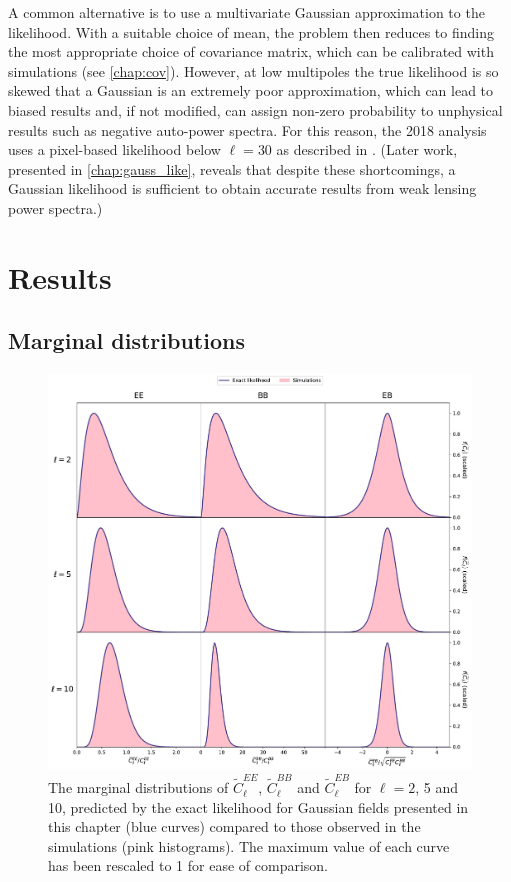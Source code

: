 A common alternative is to use a multivariate Gaussian approximation to the likelihood. With a suitable choice of mean, the problem then reduces to finding the most appropriate choice of covariance matrix, which can be calibrated with simulations (see \autoref{chap:cov}). However, at low multipoles the true likelihood is so skewed that a Gaussian is an extremely poor approximation, which can lead to biased results and, if not modified, can assign non-zero probability to unphysical results such as negative auto-power spectra. For this reason, the 2018 \Planck{} analysis uses a pixel-based likelihood below $\ell = 30$ as described in \citet{Planck2018V}. (Later work, presented in \autoref{chap:gauss_like}, reveals that despite these shortcomings, a Gaussian likelihood is sufficient to obtain accurate results from weak lensing power spectra.)

\section{Results}
\label{el_Sec:results}

\subsection{Marginal distributions}

\begin{figure}
\includegraphics[width=\columnwidth]{marg_plots}
\caption{The marginal distributions of $\widetilde{C}_\ell^{EE}$, $\widetilde{C}_\ell^{BB}$ and $\widetilde{C}_\ell^{EB}$ for $\ell = 2$, 5 and 10, predicted by the exact likelihood for Gaussian fields presented in this chapter (blue curves) compared to those observed in the simulations (pink histograms). The maximum value of each curve has been rescaled to 1 for ease of comparison.}
\label{el_Fig:marginals}
\end{figure}

